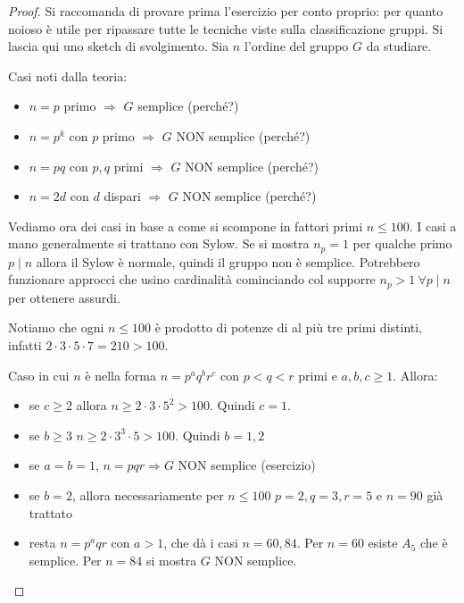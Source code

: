 \begin{proof}
    Si raccomanda di provare prima l'esercizio per conto proprio: per quanto noioso è utile per ripassare tutte le tecniche viste sulla classificazione gruppi. Si lascia qui uno sketch di svolgimento. Sia $n$ l'ordine del gruppo $G$ da studiare.

    Casi noti dalla teoria:
    \begin{itemize}
        \item $n = p$ primo $\Rightarrow$ $G$ semplice (perché?) 
        \item $n = p^k$ con $p$ primo $\Rightarrow$ $G$ NON semplice (perché?)
        \item $n = pq$ con $p,q$ primi $\Rightarrow$ $G$ NON semplice (perché?)
        \item $n = 2d$ con $d$ dispari $\Rightarrow$ $G$ NON semplice (perché?)
    \end{itemize}
    Vediamo ora dei casi in base a come si scompone in fattori primi $n \leq 100$. I casi a mano generalmente si trattano con Sylow. Se si mostra $n_p = 1$ per qualche primo $p  \mid  n$ allora il Sylow è normale, quindi il gruppo non è semplice. Potrebbero funzionare approcci che usino cardinalità cominciando col supporre $n_p > 1 \ \forall p  \mid  n$ per ottenere assurdi.
    
    Notiamo che ogni $n \le 100$ è prodotto di potenze di al più tre primi distinti, infatti $2 \cdot 3 \cdot 5 \cdot 7 = 210 > 100$.

    Caso in cui $n$ è nella forma $n = p^aq^br^c$ con $p < q < r$ primi e $a, b, c \geq 1$. Allora:
    \begin{itemize}
        \item se $c \geq 2$ allora $n \geq 2 \cdot 3 \cdot 5^2 > 100$. Quindi $c =1$.
        \item se $b \geq 3$ $n \geq 2 \cdot 3^3 \cdot 5 > 100$. Quindi $b = 1,2$
        \item se $a=b=1$, $n = pqr \Rightarrow G$ NON semplice (esercizio)
        \item se $b = 2$, allora necessariamente per $n \leq 100$ $p=2, q = 3, r = 5$ e $n = 90$ già trattato 
        \item resta $n = p^a qr$ con $a >1$, che dà i casi $n = 60,84$. Per $n = 60$ esiste $A_5$ che è semplice. Per $n = 84$ si mostra $G$ NON semplice.
    \end{itemize}
    

\end{proof}
